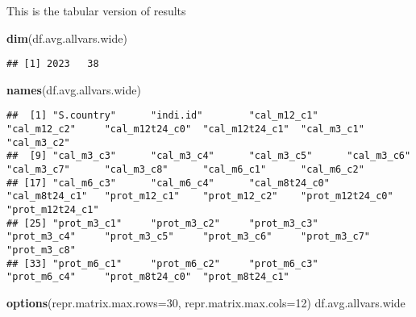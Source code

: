 \documentclass[
]{book}
\newenvironment{Shaded}{\begin{snugshade}}{\end{snugshade}}
\newcommand{\DataTypeTok}[1]{\textcolor[rgb]{0.13,0.29,0.53}{#1}}
\newcommand{\DecValTok}[1]{\textcolor[rgb]{0.00,0.00,0.81}{#1}}
\newcommand{\KeywordTok}[1]{\textcolor[rgb]{0.13,0.29,0.53}{\textbf{#1}}}
\newcommand{\NormalTok}[1]{#1}
\begin{document}
This is the tabular version of results

\begin{Shaded}
\begin{Highlighting}[]
\KeywordTok{dim}\NormalTok{(df.avg.allvars.wide)}
\end{Highlighting}
\end{Shaded}

\begin{verbatim}
## [1] 2023   38
\end{verbatim}

\begin{Shaded}
\begin{Highlighting}[]
\KeywordTok{names}\NormalTok{(df.avg.allvars.wide)}
\end{Highlighting}
\end{Shaded}

\begin{verbatim}
##  [1] "S.country"      "indi.id"        "cal_m12_c1"     "cal_m12_c2"     "cal_m12t24_c0"  "cal_m12t24_c1"  "cal_m3_c1"      "cal_m3_c2"     
##  [9] "cal_m3_c3"      "cal_m3_c4"      "cal_m3_c5"      "cal_m3_c6"      "cal_m3_c7"      "cal_m3_c8"      "cal_m6_c1"      "cal_m6_c2"     
## [17] "cal_m6_c3"      "cal_m6_c4"      "cal_m8t24_c0"   "cal_m8t24_c1"   "prot_m12_c1"    "prot_m12_c2"    "prot_m12t24_c0" "prot_m12t24_c1"
## [25] "prot_m3_c1"     "prot_m3_c2"     "prot_m3_c3"     "prot_m3_c4"     "prot_m3_c5"     "prot_m3_c6"     "prot_m3_c7"     "prot_m3_c8"    
## [33] "prot_m6_c1"     "prot_m6_c2"     "prot_m6_c3"     "prot_m6_c4"     "prot_m8t24_c0"  "prot_m8t24_c1"
\end{verbatim}

\begin{Shaded}
\begin{Highlighting}[]
\KeywordTok{options}\NormalTok{(}\DataTypeTok{repr.matrix.max.rows=}\DecValTok{30}\NormalTok{, }\DataTypeTok{repr.matrix.max.cols=}\DecValTok{12}\NormalTok{)}
\NormalTok{df.avg.allvars.wide}
\end{Highlighting}
\end{Shaded}
\end{document}
